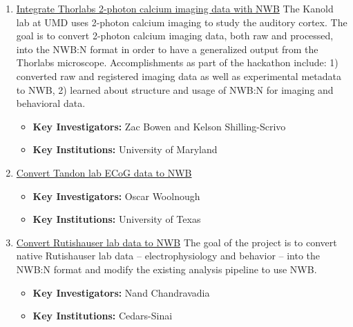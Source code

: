 \documentclass{article}
\begin{document}
\begin{enumerate}
    \item \href{https://neurodatawithoutborders.github.io/nwb_hackathons/HCK06_2019_Janelia/projects/kanoldLabNWB/}{Integrate Thorlabs 2-photon calcium imaging data with NWB} The Kanold lab at UMD uses 2-photon calcium imaging to study the auditory cortex. The goal is to convert 2-photon calcium imaging data, both raw and processed, into the NWB:N format in order to have a generalized output from the Thorlabs microscope. Accomplishments as part of the hackathon include: 1) converted raw and registered imaging data as well as experimental metadata to NWB, 2) learned about structure and usage of NWB:N for imaging and behavioral data.
        \vspace{-0.2cm}
        \begin{itemize}[noitemsep]
            \item \textbf{Key Investigators:} Zac Bowen and Kelson Shilling-Scrivo
            \item \textbf{Key Institutions:} University of Maryland
        \end{itemize}
        
    \item \href{https://neurodatawithoutborders.github.io/nwb_hackathons/HCK06_2019_Janelia/projects/tandonlab2NWB/}{Convert Tandon lab ECoG data to NWB} 
        \vspace{-0.2cm}
        \begin{itemize}[noitemsep]
            \item \textbf{Key Investigators:} Oscar Woolnough
            \item \textbf{Key Institutions:} University of Texas
        \end{itemize}
        
    \item \href{https://neurodatawithoutborders.github.io/nwb_hackathons/HCK06_2019_Janelia/projects/RutishauserLab2NWB/}{Convert Rutishauser lab data to NWB} The goal of the project is to convert native Rutishauser lab data -- electrophysiology and behavior -- into the NWB:N format and modify the existing analysis pipeline to use NWB.
        \vspace{-0.2cm}
        \begin{itemize}[noitemsep]
            \item \textbf{Key Investigators:} Nand Chandravadia
            \item \textbf{Key Institutions:} Cedars-Sinai
        \end{itemize}
        

\end{enumerate}
\end{document}
